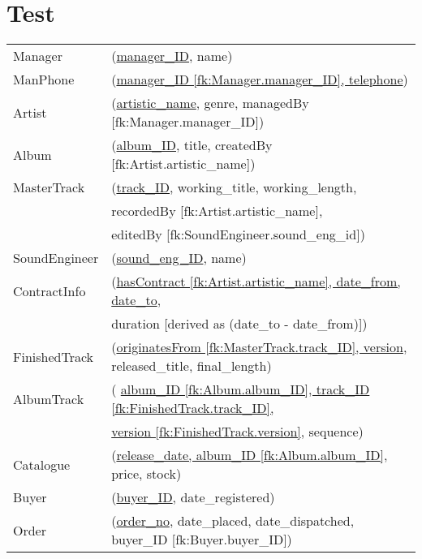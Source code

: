 \documentclass[12pt]{article}
\begin{document}
\section{Test}
		
\begin{table}[h]
 

\begin{tabular}{ll}
Manager    & (\underline{manager\_ID}, name) \\

ManPhone & (\underline{manager\_ID [fk:Manager.manager\_ID], telephone}) \\

Artist	    & 	 (\underline{artistic\_name}, genre, managedBy [fk:Manager.manager\_ID]) \\


Album	 	&  (\underline{album\_ID}, title, createdBy [fk:Artist.artistic\_name])\\

MasterTrack & (\underline{track\_ID}, working\_title, working\_length, \\
&	 	 recordedBy [fk:Artist.artistic\_name], \\
&	 	 editedBy [fk:SoundEngineer.sound\_eng\_id])\\

SoundEngineer &  (\underline{sound\_eng\_ID}, name)\\

ContractInfo &  (\underline{hasContract [fk:Artist.artistic\_name], date\_from, date\_to},\\
& duration [derived as (date\_to - date\_from)])\\

FinishedTrack & (\underline{originatesFrom [fk:MasterTrack.track\_ID], version}, released\_title, final\_length)\\

AlbumTrack & ( \underline{album\_ID [fk:Album.album\_ID], track\_ID [fk:FinishedTrack.track\_ID],}\\
           &  \underline{ version [fk:FinishedTrack.version]}, sequence)\\

Catalogue & (\underline{release\_date, album\_ID [fk:Album.album\_ID]}, price, stock)\\

Buyer & (\underline{buyer\_ID}, date\_registered)\\

Order & (\underline{order\_no}, date\_placed, date\_dispatched, buyer\_ID [fk:Buyer.buyer\_ID])\\


\end{tabular}
\end{table}
\end{document}
